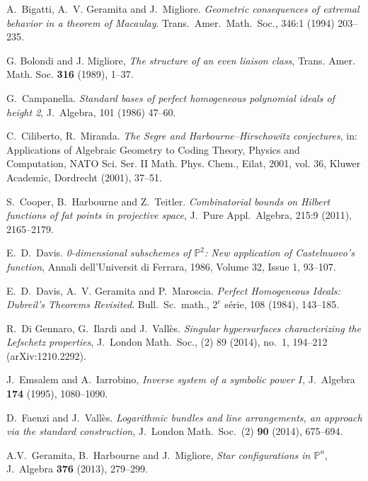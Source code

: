 \documentclass[12pt]{amsart}
\numberwithin{equation}{section}
\theoremstyle{definition}
\begin{document}
\begin{thebibliography}{BNAL}

A.\ Bigatti, A.\ V. Geramita and J.\ Migliore.
{\it Geometric consequences of extremal behavior in a theorem of Macaulay}.
Trans.\ Amer.\ Math.\ Soc., 346:1 (1994) 203--235.

 G. Bolondi and J. Migliore, {\it The structure of an even liaison class}, Trans. Amer. Math. Soc. {\bf 316} (1989), 1--37.

G.\ Campanella.
{\it Standard bases of perfect homogeneous polynomial ideals of height 2},
J.\  Algebra, 101 (1986) 47--60.

C.\ Ciliberto, R.\ Miranda.
{\it The Segre and Harbourne--Hirschowitz conjectures}, in:
Applications of Algebraic Geometry to Coding Theory, Physics and Computation, 
NATO Sci. Ser. II Math. Phys. Chem., Eilat, 2001, vol. 36, Kluwer Academic, Dordrecht (2001), 37--51.

S.\ Cooper, B.\ Harbourne and Z.\ Teitler.
{\it Combinatorial bounds on Hilbert functions of fat points in projective space},
J.\ Pure Appl.\ Algebra, 215:9 (2011),  2165--2179.

E.\ D.\ Davis.
{\it 0-dimensional subschemes of ${ \ensuremath{\mathbb{P}}}^2$: New application of Castelnuovo's function},
Annali dell'Universit di Ferrara, 1986, Volume 32, Issue 1, 93--107.

E.\ D.\ Davis, A.\ V. Geramita and P.\  Maroscia. 
{\it Perfect Homogeneous Ideals: Dubreil's Theorems Revisited}.
Bull.\ Sc.\ math., $2^e$ s\'erie, 108 (1984), 143--185.

R.\ Di Gennaro, G.\ Ilardi and J.\ Vall\`es. 
{\it Singular hypersurfaces characterizing the Lefschetz properties}, 
J.\ London Math.\ Soc., (2) 89 (2014), no.\ 1, 194--212 (arXiv:1210.2292).

J.\ Emsalem and A.\ Iarrobino, 
{\it Inverse system of a symbolic power $I$}, 
J.\ Algebra {\bf 174} (1995), 1080--1090.

D.\ Faenzi and J.\ Vall\`es.
{\it Logarithmic bundles and line arrangements, an approach via the standard construction}, 
J.\ London Math.\ Soc.\ (2) {\bf 90} (2014), 675--694.

A.V.\ Geramita, B.\ Harbourne and J.\ Migliore, 
{\it Star configurations in $\mathbb P^n$}, 
J.\ Algebra {\bf 376} (2013), 279--299. 


\end{thebibliography}
\end{document}
